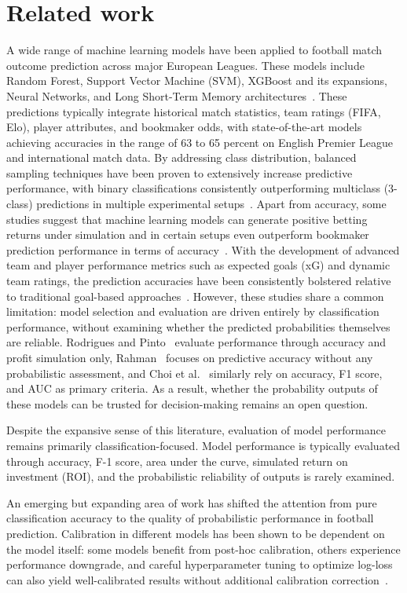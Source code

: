 \documentclass[conference]{IEEEtran}
\begin{document}
\section{Related work}
A wide range of machine learning models have been applied to
football match outcome prediction across major European Leagues.
These models include Random Forest, Support Vector Machine (SVM),
XGBoost and its expansions, Neural Networks, and Long Short-Term
Memory architectures~\cite{b1}\cite{b2}\cite{b3}. These
predictions typically integrate historical match statistics, team
ratings (FIFA, Elo), player attributes, and bookmaker odds, with
state-of-the-art models achieving accuracies in the range of 63
to 65 percent on English Premier League and international match
data. By addressing class distribution, balanced sampling
techniques have been proven to extensively increase predictive
performance, with binary classifications consistently
outperforming multiclass (3-class) predictions in multiple
experimental setups~\cite{b3}. Apart from accuracy, some studies
suggest that machine learning models can generate positive betting
returns under simulation and in certain setups even outperform
bookmaker prediction performance in terms of
accuracy~\cite{b4}. With the development of advanced team and
player performance metrics such as expected goals (xG) and dynamic
team ratings, the prediction accuracies have been consistently
bolstered relative to traditional goal-based
approaches~\cite{b5}.
However, these studies share a common limitation: model selection
and evaluation are driven entirely by classification performance,
without examining whether the predicted probabilities themselves
are reliable. Rodrigues and Pinto~\cite{b1} evaluate performance
through accuracy and profit simulation only, Rahman~\cite{b2}
focuses on predictive accuracy without any probabilistic
assessment, and Choi et al.~\cite{b3} similarly rely on accuracy,
F1 score, and AUC as primary criteria. As a result, whether the
probability outputs of these models can be trusted for
decision-making remains an open question.

Despite the expansive sense of this literature, evaluation of
model performance remains primarily classification-focused. Model
performance is typically evaluated through accuracy, F-1 score,
area under the curve, simulated return on investment (ROI), and
the probabilistic reliability of outputs is rarely examined.

An emerging but expanding area of work has shifted the attention
from pure classification accuracy to the quality of probabilistic
performance in football prediction. Calibration in different
models has been shown to be dependent on the model itself: some
models benefit from post-hoc calibration, others experience
performance downgrade, and careful hyperparameter tuning to
optimize log-loss can also yield well-calibrated results without
additional calibration correction~\cite{b6}.
\end{document}
